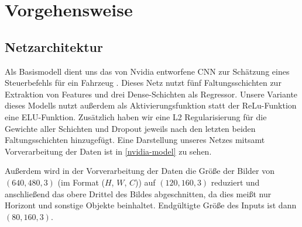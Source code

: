 
\chapter{Vorgehensweise}

\section{Netzarchitektur}

Als Basismodell dient uns das von Nvidia entworfene CNN zur Schätzung eines Steuerbefehls für ein Fahrzeug \cite{nvidia}. Dieses Netz nutzt fünf Faltungsschichten zur Extraktion von Features und drei Dense-Schichten als Regressor. Unsere Variante dieses Modells nutzt außerdem als Aktivierungsfunktion statt der ReLu-Funktion eine ELU-Funktion. Zusätzlich haben wir eine L2 Regularisierung für die Gewichte aller Schichten und Dropout jeweils nach den letzten beiden Faltungsschichten hinzugefügt. Eine Darstellung unseres Netzes mitsamt Vorverarbeitung der Daten ist in \ref{nvidia-model} zu sehen.

Außerdem wird in der Vorverarbeitung der Daten die Größe der Bilder von $(640, 480, 3)$ (im Format ($H$, $W$, $C$)) auf $(120, 160, 3)$ reduziert und anschließend das obere Drittel des Bildes abgeschnitten, da dies meißt nur Horizont und sonstige Objekte beinhaltet. Endgültigte Größe des Inputs ist dann $(80, 160, 3)$.

